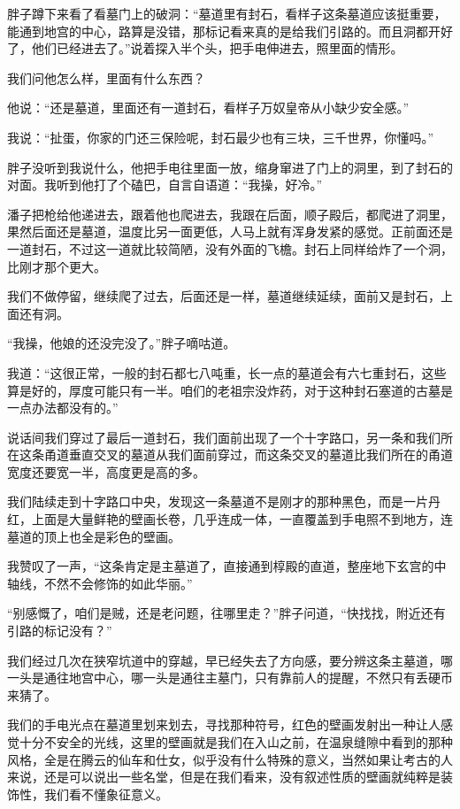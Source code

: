 胖子蹲下来看了看墓门上的破洞：“墓道里有封石，看样子这条墓道应该挺重要，能通到地宫的中心，路算是没错，那标记看来真的是给我们引路的。而且洞都开好了，他们已经进去了。”说着探入半个头，把手电伸进去，照里面的情形。

我们问他怎么样，里面有什么东西？

他说：“还是墓道，里面还有一道封石，看样子万奴皇帝从小缺少安全感。”

我说：“扯蛋，你家的门还三保险呢，封石最少也有三块，三千世界，你懂吗。”

胖子没听到我说什么，他把手电往里面一放，缩身窜进了门上的洞里，到了封石的对面。我听到他打了个磕巴，自言自语道：“我操，好冷。”

潘子把枪给他递进去，跟着他也爬进去，我跟在后面，顺子殿后，都爬进了洞里，果然后面还是墓道，温度比另一面更低，人马上就有浑身发紧的感觉。正前面还是一道封石，不过这一道就比较简陋，没有外面的飞檐。封石上同样给炸了一个洞，比刚才那个更大。

我们不做停留，继续爬了过去，后面还是一样，墓道继续延续，面前又是封石，上面还有洞。

“我操，他娘的还没完没了。”胖子嘀咕道。

我道：“这很正常，一般的封石都七八吨重，长一点的墓道会有六七重封石，这些算是好的，厚度可能只有一半。咱们的老祖宗没炸药，对于这种封石塞道的古墓是一点办法都没有的。”

说话间我们穿过了最后一道封石，我们面前出现了一个十字路口，另一条和我们所在这条甬道垂直交叉的墓道从我们面前穿过，而这条交叉的墓道比我们所在的甬道宽度还要宽一半，高度更是高的多。

我们陆续走到十字路口中央，发现这一条墓道不是刚才的那种黑色，而是一片丹红，上面是大量鲜艳的壁画长卷，几乎连成一体，一直覆盖到手电照不到地方，连墓道的顶上也全是彩色的壁画。

我赞叹了一声，“这条肯定是主墓道了，直接通到椁殿的直道，整座地下玄宫的中轴线，不然不会修饰的如此华丽。”

“别感慨了，咱们是贼，还是老问题，往哪里走？”胖子问道，“快找找，附近还有引路的标记没有？”

我们经过几次在狭窄坑道中的穿越，早已经失去了方向感，要分辨这条主墓道，哪一头是通往地宫中心，哪一头是通往主墓门，只有靠前人的提醒，不然只有丢硬币来猜了。

我们的手电光点在墓道里划来划去，寻找那种符号，红色的壁画发射出一种让人感觉十分不安全的光线，这里的壁画就是我们在入山之前，在温泉缝隙中看到的那种风格，全是在腾云的仙车和仕女，似乎没有什么特殊的意义，当然如果让考古的人来说，还是可以说出一些名堂，但是在我们看来，没有叙述性质的壁画就纯粹是装饰性，我们看不懂象征意义。

